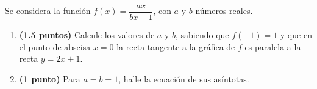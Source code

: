 
Se considera la función $f(x)=\dfrac{ax}{bx+1}$, con $a$ y $b$ números reales.
\begin{enumerate}[label=\alph*)]
\item \textbf{(1.5 puntos)} Calcule los valores de $a$ y $b$, sabiendo que $f(-1)=1$ y que en el punto de abscisa $x=0$ la recta tangente a la gráfica de $f$ es paralela a la recta $y=2x+1$.
\item \textbf{(1 punto)} Para $a=b=1$, halle la ecuación de sus asíntotas.
\end{enumerate}
